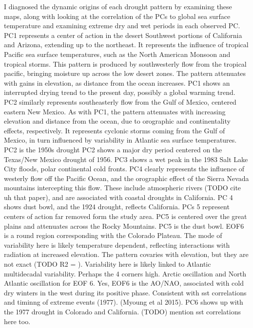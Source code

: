 \documentclass[10pt]{iopart}
\begin{document}
I diagnosed the dynamic origins of each drought pattern by examining these maps, along with looking at the correlation of the PCs to global sea surface temperature and examining extreme dry and wet periods in each observed PC.
PC1 represents a center of action in the desert Southwest portions of California and Arizona, extending up to the northeast. It represents the influence of tropical Pacific sea surface temperatures, such as the North American Monsoon and tropical storms. This pattern is produced by southwesterly flow from the tropical pacific, bringing moisture up across the low desert zones. The pattern attenuates with gains in elevation, as distance from the ocean increases. PC1 shows an interrupted drying trend to the present day, possibly a global warming trend. PC2 similarly represents southeasterly flow from the Gulf of Mexico, centered eastern New Mexico. As with PC1, the pattern attenuates with increasing elevation and distance from the ocean, due to orographic and continentality effects, respectively. It represents cyclonic storms coming from the Gulf of Mexico, in turn influenced by variability in Atlantic sea surface temperatures. PC2 is the 1950s drought PC2 shows a major dry period centered on the Texas/New Mexico drought of 1956. PC3 shows a wet peak in the 1983 Salt Lake City floods, polar continental cold fronts. PC4 clearly represents the influence of westerly flow off the Pacific Ocean, and the orographic effect of the Sierra Nevada mountains intercepting this flow. These include atmospheric rivers (TODO cite uh that paper), and are associated with coastal droughts in California. PC 4 shows dust bowl, and the 1924 drought, reflects California. PCs 5 represent centers of action far removed form the study area. PC5 is centered over the great plains and attenuates across the Rocky Mountains. PC5 is the dust bowl. EOF6 is a round region corresponding with the Colorado Plateau. The mode of variability here is likely temperature dependent, reflecting interactions with radiation at increased elevation. The pattern covaries with elevation, but they are not exact (TODO R2 = ). Variability here is likely linked to Atlantic multidecadal variability. Perhaps the 4 corners high. Arctic oscillation and North Atlantic oscillation for EOF 6. Yes, EOF6 is the AO/NAO, associated with cold dry winters in the west during its positive phase. Consistent with sst correlations and timinng of extreme events (1977). (Myoung et al 2015). PC6 shows up with the 1977 drought in Colorado and California. (TODO) mention sst correlations here too.
\end{document}
